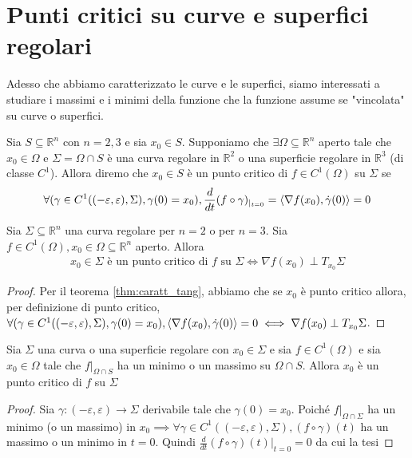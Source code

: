 \documentclass[openany, italian]{book}
\begin{document}
\section{Punti critici su curve e superfici regolari}
Adesso che abbiamo caratterizzato le curve e le superfici, siamo interessati a studiare i massimi e i minimi della funzione che la funzione assume se "vincolata" su curve o superfici. \\
\begin{definition}
Sia $S \subseteq \mathbb{R}^n$ con $n=2, 3$ e sia $x_0 \in S$. Supponiamo che $\exists \Omega \subseteq \mathbb{R}^n$ aperto tale che $x_0 \in \Omega$ e $\Sigma = \Omega \cap S$ è una curva regolare in $\mathbb{R}^2$ o una superficie regolare in $\mathbb{R}^3$ (di classe $C^1$). Allora diremo che $x_0 \in S$ è un punto critico di $f \in C^1(\Omega)$ su $\Sigma$ se
$$
\forall (\gamma \in C^1 ((-\varepsilon, \varepsilon), \Sigma), \gamma(0) = x_0), \frac{d}{dt} (f \circ \gamma)_{|_{t=0}} = \langle \nabla f(x_0), \dot{\gamma}(0) \rangle = 0
$$
\end{definition}
\begin{theorem}
Sia $\Sigma \subseteq \mathbb{R}^n$ una curva regolare per $n=2$ o per $n=3$. Sia $f \in C^1(\Omega), x_0 \in \Omega \subseteq \mathbb{R}^n$ aperto. Allora 
\begin{align*}
x_0 \in \Sigma \text{ è un punto critico di } f \text{ su } \Sigma  \iff \nabla f(x_0) \perp T_{x_0} \Sigma
\end{align*}
\end{theorem}
\begin{proof}
Per il teorema \ref{thm:caratt_tang}, abbiamo che se $x_0$ è punto critico allora, per definizione di punto critico, $\forall (\gamma \in C^1((-\varepsilon, \varepsilon), \Sigma), \gamma(0)=x_0), \langle \nabla f(x_0), \dot{\gamma}(0) \rangle = 0 \iff \nabla f(x_0) \perp T_{x_0} \Sigma$.
\end{proof}
\begin{theorem}
Sia $\Sigma$ una curva o una superficie regolare con $x_0 \in \Sigma$ e sia $f \in C^{1}(\Omega)$ e sia $x_0 \in \Omega$ tale che $f|_{\Omega \cap S}$ ha un minimo o un massimo su $\Omega \cap S$. Allora $x_0$ è un punto critico di $f$ su $\Sigma$
\end{theorem}
\begin{proof}
Sia $\gamma: (-\varepsilon, \varepsilon) \to \Sigma$ derivabile tale che $\gamma(0) = x_0$. Poiché $f|_{\Omega \cap \Sigma}$ ha un minimo (o un massimo) in $x_0 \implies \forall \gamma \in C^{1}((-\varepsilon, \varepsilon), \Sigma), (f \circ \gamma)(t)$ ha un massimo o un minimo in $t = 0$. Quindi $\frac{d}{dt}(f \circ \gamma)(t)|_{t=0} = 0$ da cui la tesi
\end{proof}
\end{document}
